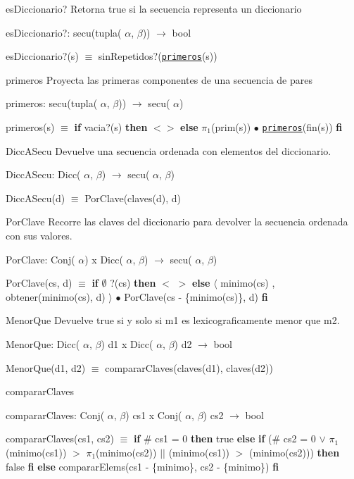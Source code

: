 \begin{DoxyParagraph}{es\-Diccionario?}
\-Retorna true si la secuencia representa un diccionario
\end{DoxyParagraph}
es\-Diccionario?\-: secu(tupla( $\alpha$, $\beta$)) $\to$ bool\par
 es\-Diccionario?(s) $\equiv$ sin\-Repetidos?(\href{axiomas.html#primeros}{\tt primeros}(s)) 

\begin{DoxyParagraph}{primeros}
\-Proyecta las primeras componentes de una secuencia de pares
\end{DoxyParagraph}
primeros\-: secu(tupla( $\alpha$, $\beta$)) $\to$ secu( $\alpha$)\par
 primeros(s) $\equiv$ {\bfseries if} vacia?(s) {\bfseries then} $<$$>$ {\bfseries else} $\pi_1$(prim(s)) $\bullet$ \href{axiomas.html#primeros}{\tt primeros}(fin(s)) {\bfseries fi} 

\begin{DoxyParagraph}{\-Dicc\-A\-Secu}
\-Devuelve una secuencia ordenada con elementos del diccionario.
\end{DoxyParagraph}
\-Dicc\-A\-Secu\-: \-Dicc( $\alpha$, $\beta$) $\to$ secu( $\alpha$, $\beta$)\par
 \-Dicc\-A\-Secu(d) $\equiv$ \-Por\-Clave(claves(d), d) 

\begin{DoxyParagraph}{\-Por\-Clave}
\-Recorre las claves del diccionario para devolver la secuencia ordenada con sus valores.
\end{DoxyParagraph}
\-Por\-Clave\-: \-Conj( $\alpha$) x \-Dicc( $\alpha$, $\beta$) $\to$ secu( $\alpha$, $\beta$)\par
 \-Por\-Clave(cs, d) $\equiv$ {\bfseries if} $\emptyset$ ?(cs) {\bfseries then} $<$ $>$ {\bfseries else} $\langle$ minimo(cs) , obtener(minimo(cs), d) $\rangle$ $\bullet$ \-Por\-Clave(cs -\/ \{minimo(cs)\}, d) {\bfseries fi} 

\begin{DoxyParagraph}{\-Menor\-Que}
\-Devuelve true si y solo si m1 es lexicograficamente menor que m2.
\end{DoxyParagraph}
\-Menor\-Que\-: \-Dicc( $\alpha$, $\beta$) d1 x \-Dicc( $\alpha$, $\beta$) d2 $\to$ bool\par
 \-Menor\-Que(d1, d2) $\equiv$ comparar\-Claves(claves(d1), claves(d2)) 

\begin{DoxyParagraph}{comparar\-Claves}

\end{DoxyParagraph}
comparar\-Claves\-: \-Conj( $\alpha$, $\beta$) cs1 x \-Conj( $\alpha$, $\beta$) cs2 $\to$ bool\par
 comparar\-Claves(cs1, cs2) $\equiv$ {\bfseries if} \# cs1 = 0 {\bfseries then} true {\bfseries else} {\bfseries if} (\# cs2 = 0 $\lor$ $\pi_1$(minimo(cs1)) $>$ $\pi_1$(minimo(cs2)) $|$$|$ (minimo(cs1)) $>$ (minimo(cs2))) {\bfseries then} false {\bfseries fi} {\bfseries else} comparar\-Elems(cs1 -\/ \{minimo\}, cs2 -\/ \{minimo\}) {\bfseries fi} 

